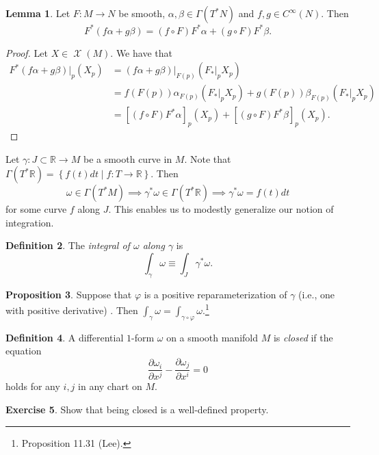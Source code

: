 \documentclass[10pt,letterpaper,cm]{nupset}
\theoremstyle{definition}
\newtheorem{definition}{Definition}[subsection]
\theoremstyle{theorem}
\newtheorem{lemma}[definition]{Lemma}
\newtheorem{prop}[definition]{Proposition}
\newtheorem{exercise}[definition]{Exercise}
\theoremstyle{remark}
\newcommand{\R}{\mathbb R}
\newcommand{\1}{\mathbf{1}}
\newcommand{\0}{\vec 0}
\DeclareMathOperator{\vf}{\mathscr{X}}
\begin{document}
\begin{lemma}
Let $F: M \to N$ be smooth, $\alpha, \beta \in \Gamma(T^{\ast} N)$ and $f, g \in C^{\infty}(N)$. Then $$F^{\ast}(f \alpha + g \beta) = (f \circ F)F^{\ast} \alpha + (g \circ F)F^{\ast} \beta.$$
\end{lemma}
\begin{proof}
Let $X \in \vf(M)$. We have that
\begin{align*}
F^{\ast}(f \alpha + g\beta)\bigr\rvert_p(X_p) & = (f \alpha + g \beta)\bigr\rvert_{F(p)}\left(F_{\ast}\bigr\rvert_p X_p\right) 
\\ & = 
f\left(F(p)\right)\alpha_{F(p)}\left(F_{\ast}\bigr\rvert_p  X_p\right)+ g\left(F(p)\right)\beta_{F(p)}\left(F_{\ast}\bigr\rvert_p X_p\right)
\\ &   = \left[(f\circ F)F^{\ast}\alpha\right]_p (X_p) + \left[(g\circ F) F^{\ast}\beta\right]_p(X_p).
\end{align*}
\end{proof}

Let $\gamma : J \subset \R \to M$ be a smooth curve in $M$.  Note that $\Gamma(T^{\ast}\R) = \left\{f(t)dt \mid f : T \to \R\right\}$. Then
$$ \omega \in \Gamma(T^{\ast}M) \implies \gamma^{\ast} \omega \in \Gamma(T^{\ast}\R) \implies \gamma^{\ast}\omega = f(t)dt$$ for some curve $f$ along $J$. This enables us to modestly generalize our notion of integration.

\begin{definition}
The \textit{integral of $\omega$ along $\gamma$} is $$\int_{\gamma} \omega \equiv \int_J \gamma^{\ast}\omega.$$ 
\end{definition}

\begin{prop}
Suppose that $\varphi$ is a positive reparameterization of $\gamma$ (i.e., one with positive derivative) . Then $\int_{\gamma} \omega = \int_{\gamma \circ \varphi} \omega$.\footnote{Proposition 11.31 (Lee).}
\end{prop}

\begin{definition}\label{closed}
A differential $1$-form $\omega$ on a smooth manifold $M$ is \textit{closed} if the equation  $$\frac{\partial{\omega_i}}{\partial{x^j}} - \frac{\partial{\omega_j}}{\partial{x^i}} =0$$ holds for any $i,j$ in any chart on $M$.
\end{definition}

\begin{exercise}
Show that being closed is a well-defined property.
\end{exercise}
\end{document}
